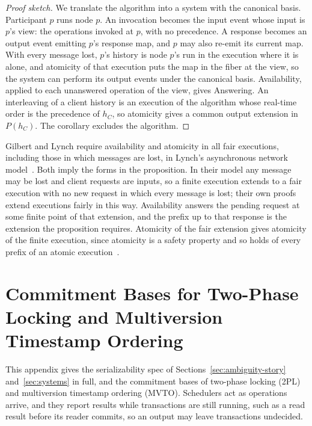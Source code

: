 \documentclass[sigconf]{cidr-2027}
\theoremstyle{remark}
\newcommand{\commitment}{commitment\xspace}
\newcommand{\Commitment}{Commitment\xspace}
\newcommand{\outnoun}{output extension\xspace}%
\newcommand{\fiber}[1]{P(#1)}
\begin{document}
\color{blue!70!black}\begin{proof}[Proof sketch]
We translate the algorithm into a system with the canonical basis.  Participant
$p$ runs node $p$.  An invocation becomes the input event whose input is $p$'s
view: the operations invoked at $p$, with no precedence.  A response becomes an
output event emitting $p$'s response map, and $p$ may also re-emit its current
map.  With every message lost, $p$'s history is node $p$'s run in the
execution where it is alone, and atomicity of that execution puts the map in
the fiber at the view, so the system can perform its output events under the
canonical basis.  Availability, applied
to each unanswered operation of the view, gives Answering.  An interleaving of
a client history is an execution of the algorithm whose real-time order is the
precedence of $h_C$, so atomicity gives a common \outnoun in $\fiber{h_C}$.
The corollary excludes the algorithm.\color{black}
\end{proof}

Gilbert and Lynch require availability and atomicity in all fair executions,
including those in which messages are lost, in Lynch's asynchronous network
model~\cite[Theorem~1]{gilbert2002cap}\cite[Chapter~8]{lynch1996distributed}.
Both imply the forms in the proposition.  In their model any message may be
lost and client requests are inputs, so a finite execution extends to a fair
execution with no new request in which every message is lost; their own
proofs extend executions fairly in this way.  Availability answers the pending
request at some finite point of that extension, and the prefix up to that
response is the extension the proposition requires.  Atomicity of the fair
extension gives atomicity of the finite execution, since atomicity is a safety
property and so holds of every prefix of an atomic
execution~\cite[Chapter~13]{lynch1996distributed}.

\section{\Commitment Bases for Two-Phase Locking and Multiversion Timestamp Ordering}
\label{app:cc-bases}

This appendix gives the serializability spec of
Sections~\ref{sec:ambiguity-story} and~\ref{sec:systems} in full, and the
\commitment bases of two-phase locking (2PL) and multiversion timestamp ordering
(MVTO).  Schedulers act as operations arrive, and they report results while
transactions are still running, such as a read result before its reader
commits, so an output may leave transactions undecided.
\end{document}
